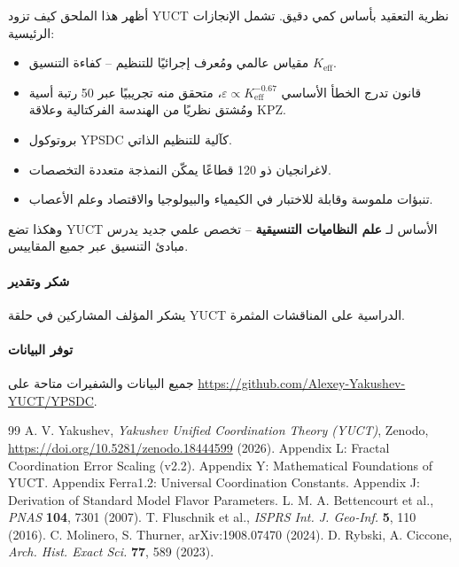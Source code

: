 \documentclass[11pt,a4paper]{article}
\theoremstyle{remark}
\newcommand{\Keff}{K_{\mathrm{eff}}}
\begin{document}
	أظهر هذا الملحق كيف تزود YUCT نظرية التعقيد بأساس كمي دقيق. تشمل الإنجازات الرئيسية:
	\begin{itemize}
		\item مقياس عالمي ومُعرف إجرائيًا للتنظيم – كفاءة التنسيق \(\Keff\).
		\item قانون تدرج الخطأ الأساسي \(\varepsilon \propto \Keff^{-0.67}\)، متحقق منه تجريبيًا عبر 50 رتبة أسية ومُشتق نظريًا من الهندسة الفركتالية وعلاقة KPZ.
		\item بروتوكول YPSDC كآلية للتنظيم الذاتي.
		\item لاغرانجيان ذو 120 قطاعًا يمكّن النمذجة متعددة التخصصات.
		\item تنبؤات ملموسة وقابلة للاختبار في الكيمياء والبيولوجيا والاقتصاد وعلم الأعصاب.
	\end{itemize}
	
	وهكذا تضع YUCT الأساس لـ \textbf{علم النظاميات التنسيقية} – تخصص علمي جديد يدرس مبادئ التنسيق عبر جميع المقاييس.
	
	\paragraph*{شكر وتقدير}
	يشكر المؤلف المشاركين في حلقة YUCT الدراسية على المناقشات المثمرة.
	
	\paragraph*{توفر البيانات}
	جميع البيانات والشفيرات متاحة على \url{https://github.com/Alexey-Yakushev-YUCT/YPSDC}.
	
	\begin{thebibliography}{99}
		 A. V. Yakushev, \emph{Yakushev Unified Coordination Theory (YUCT)}, Zenodo, \url{https://doi.org/10.5281/zenodo.18444599} (2026).
		 Appendix L: Fractal Coordination Error Scaling (v2.2).
		 Appendix Y: Mathematical Foundations of YUCT.
		 Appendix Ferra1.2: Universal Coordination Constants.
		 Appendix J: Derivation of Standard Model Flavor Parameters.
		 L. M. A. Bettencourt et al., \emph{PNAS} \textbf{104}, 7301 (2007).
		 T. Fluschnik et al., \emph{ISPRS Int. J. Geo‑Inf.} \textbf{5}, 110 (2016).
		 C. Molinero, S. Thurner, arXiv:1908.07470 (2024).
		 D. Rybski, A. Ciccone, \emph{Arch. Hist. Exact Sci.} \textbf{77}, 589 (2023).
	\end{thebibliography}
	
\end{document}
